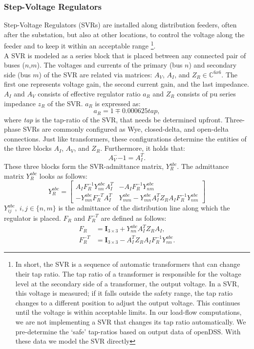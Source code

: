 \documentclass[10pt,journal]{article}
\begin{document}
\subsubsection{Step-Voltage Regulators}
Step-Voltage Regulators (SVRs) are installed along distribution feeders, often after the substation, but also at other locations, to control the voltage along the feeder and to keep it within an acceptable range \footnote{
In short, the SVR is a sequence of automatic transformers that can change their tap ratio. The tap ratio of a transformer is responsible for the voltage level at the secondary side of a transformer, the output voltage. In a SVR, this voltage is measured; if it falls outside the safety range, the tap ratio changes to a different position to adjust the output voltage. This continues until the voltage is within acceptable limits.
In our load-flow  computations, we are not implementing a SVR that changes its tap ratio automatically. We pre-determine the `safe' tap-ratios based on output data of openDSS. With these data we model the SVR directly}. \\
A SVR is modeled as a series block that is placed between any connected pair of buses ($n$,$m$). The  voltages and currents of the primary (bus $n$) and secondary side (bus $m$) of the SVR are related via matrices:  $A_V$, $A_I$, and $Z_R\in\mathbb{C}^{6x6}$. The first one represents voltage gain, the second current gain, and the last impedance. $A_I$ and $A_V$ consists of effective regulator ratio $a_R$ and $Z_R$ consists of pu series impedance $z_R$ of the SVR. $a_R$ is expressed as:
\begin{equation}
    a_R = 1\mp 0.000625tap, 
\end{equation} where \textit{tap} is the tap-ratio of the SVR, that needs be determined upfront. 
Three-phase SVRs are commonly configured as Wye, closed-delta, and open-delta connections. Just like transformers, these configurations determine the entities of the three blocks $A_I$, $A_V$, and $Z_R$. Furthermore, it holds that:  \begin{equation}
    A_V^-{-1}=A_I^T.
\end{equation}
These three blocks form the SVR-admittance matrix, $Y^{abc}_{R}$. The admittance matrix $Y^{abc}_R$ looks as follows:
\begin{equation}Y^{abc}_{R}=
\begin{bmatrix}
A_I F_R^{-1}Y^{abc}_{nn}A_I^T & -A_I F_R^{-1}Y^{abc}_{nm} \\[7pt]
-Y^{abc}_{mn}F_R^{-T}A_I^T & Y^{abc}_{mm}-Y^{abc}_{mn} A_I^TZ_RA_IF_R^{-1}Y^{abc}_{nm} 
\end{bmatrix}
\end{equation}
$Y^{abc}_{ij},\ i,j\in\{n,m\}$ is the admittance of the distribution line along which the regulator is placed. $F_R$ and $F_R^{-T}$ are defined as follows: 
\begin{align}
    F_R &= \mathbf{I}_{3\times 3}+Y^{abc}_{nn}A_I^TZ_RA_I,\\[3pt]
    F_R^{-T} &= \mathbf{I}_{3\times 3} - A_I^T Z_R A_I F_R^{-1}Y_{nn}^{abc}. 
\end{align}
\end{document}
